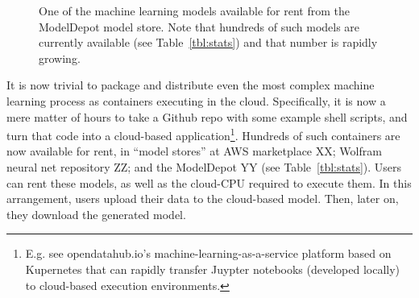 \documentclass{NSF}
\newcommand{\tbl}[1]{Table~\ref{tbl:#1}}
\begin{document}
\begin{nsfdescription}
\begin{figure}
  \caption{One of the machine learning models
  available for rent from the ModelDepot model store.
  Note that hundreds of such models
  are currently available (see \tbl{stats})
  and that number is rapidly growing.}\label{fig:one}
  \end{figure}
  
  It is now trivial to package and distribute even
  the most complex machine learning process
  as containers executing in the cloud.
   Specifically,
   it is now a mere matter of hours to take a Github repo with some example shell  scripts, and turn that code into a cloud-based application\footnote{E.g. see opendatahub.io's machine-learning-as-a-service platform based on Kupernetes that can rapidly transfer Juypter notebooks (developed locally)  to cloud-based
  execution environments.}.
  Hundreds of
  such containers are now available for rent, in
  ``model stores'' at  AWS marketplace XX;
  Wolfram neural net repository ZZ;  and  the  ModelDepot YY
(see \tbl{stats}).  Users can
rent these models, as well as the cloud-CPU required
to execute them. In this arrangement, users upload their data to the cloud-based model. Then, later on,
they download the generated model. 


\end{nsfdescription}
\end{document}
